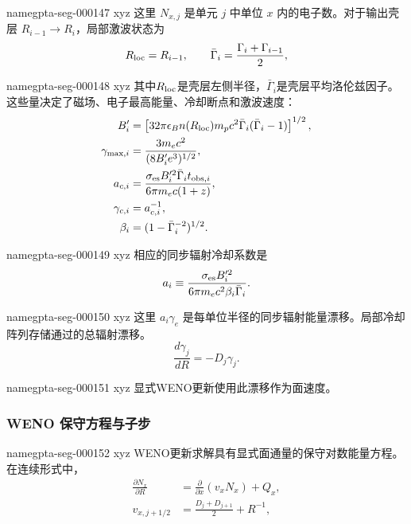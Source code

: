 \documentclass[twocolumn]{aastex702}
\makeatletter
\providecommand{\gptareaderanchor}[1]{\pdfdest name{#1} xyz}%
\providecommand{\gptareaderanchor}[1]{\special{pdf:dest (#1) [ @thispage /XYZ @xpos @ypos null ]}}%
\makeatother
\begin{document}
\gptareaderanchor{gpta-seg-000147}%
这里 \(N_{x,j}\) 是单元 \(j\) 中单位 \(x\) 内的电子数。对于输出壳层 \(R_{i-1}\rightarrow R_i\)，局部激波状态为
\begin{equation}
R_{\rm loc}=R_{i-1},\qquad
\bar\Gamma_i=\frac{\Gamma_i+\Gamma_{i-1}}{2},
\end{equation}

\gptareaderanchor{gpta-seg-000148}%
其中\(R_{\rm loc}\)是壳层左侧半径，\(\bar\Gamma_i\)是壳层平均洛伦兹因子。这些量决定了磁场、电子最高能量、冷却断点和激波速度：
\begin{equation}
\begin{aligned}
B'_i&=\left[32\pi\epsilon_B n(R_{\rm loc})m_pc^2
\bar\Gamma_i(\bar\Gamma_i-1)\right]^{1/2},\\
\gamma_{\max,i}&=\frac{3m_ec^2}{(8B'_ie^3)^{1/2}},\\
a_{c,i}&=\frac{\sigma_{\rm es}B_i'^2\bar\Gamma_i t_{{\rm obs},i}}
{6\pi m_ec(1+z)},\\
\gamma_{c,i}&=a_{c,i}^{-1},\\
\beta_i&=(1-\bar\Gamma_i^{-2})^{1/2}.
\end{aligned}
\end{equation}

\gptareaderanchor{gpta-seg-000149}%
相应的同步辐射冷却系数是
\begin{equation}
a_i\equiv \frac{\sigma_{\rm es}B_i'^2}{6\pi m_ec^2\beta_i\bar\Gamma_i}.
\end{equation}

\gptareaderanchor{gpta-seg-000150}%
这里 \(a_i\gamma_e\) 是每单位半径的同步辐射能量漂移。局部冷却阵列存储通过的总辐射漂移。
\begin{equation}
\frac{d\gamma_j}{dR}=-D_j\gamma_j .
\end{equation}

\gptareaderanchor{gpta-seg-000151}%
显式WENO更新使用此漂移作为面速度。

\subsubsection{WENO 保守方程与子步}


\gptareaderanchor{gpta-seg-000152}%
WENO更新求解具有显式面通量的保守对数能量方程。在连续形式中，
\begin{equation}
\begin{aligned}
\frac{\partial N_x}{\partial R}
&=\frac{\partial}{\partial x}\left(v_xN_x\right)+Q_x,\\
v_{x,j+1/2}
&=
\frac{D_j+D_{j+1}}{2}+R^{-1},
\end{aligned}
\end{equation}
\end{document}
